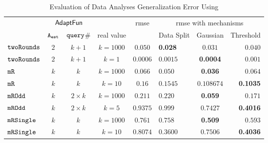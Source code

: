 {\footnotesize
\begin {table}[t]
        \vspace{-0.5cm}
        \caption{Evaluation of Data Analyses Generalization Error Using {\THESYSTEM}}
    \vspace{-0.4cm}
        \label{tb:adapt-generalization}
        \begin{center}
        \centering
{
        \begin{tabular}{|| >{\tiny}l || c | c |c || c || l | c | r ||  }
                \hhline{t|:======== :t:|}
        \multirow{2}{*}{Program $c$}
         & \multicolumn{2}{c}{$\textsf{AdaptFun}$}
         & &{rmse}
         & \multicolumn{3}{c||}{rmse with mechanisms} \\ 
         \hhline{||~---||~---||}
         & {${\mathtt{A_{est}}}$ } & {${\tt query}$\# } & real value &   & Data Split & Gaussian & Threshold  \\ 
         \hline \hline
        $  \mathtt{ twoRounds }$ & $ 2 $ & $  k + 1 $ & $ k = 1000$ & $0.050$   & {\textbf{0.028}} & {$0.031$} & $0.040$  \\
        \hhline{||-||---||-||---||}
        $  \mathtt{ twoRounds }$ & $ 2 $ & $  k + 1 $ & $ k =  1$ & $0.0006$   & {{$0.0015$}} & \textbf{0.0004} & {$0.001$}  \\
        \hhline{||-||---||-||---||}
         $  \mathtt{ mR}$ & $k$ & $k$ & $ k =  1000$  & $0.066$   & $0.050$ & {\textbf{0.036}} & $0.064$  \\
         \hhline{||-||---||-||---||}
         $  \mathtt{ mR}$ & $k$ & $k$ & $ k =  10$  & $0.16$   & $0.1545$  & $0.108674 $ & \textbf{0.1035}  \\
         \hhline{||-||---||-||---||}
         $  \mathtt{ mROdd }$ & $ k $   & $  2 \times k $& $ k =  1000$ & $0.211$   & $0.220$ & {\textbf{0.059}} & $0.171$  \\
         \hhline{||-||---||-||---||}
         $  \mathtt{ mROdd }$ & $ k $   & $  2 \times k $& $ k =  5$ & $0.9375$   & $0.999$ & $0.7427$ & {\textbf{0.4016}}  \\
         \hhline{||-||---||-||---||}
         $  \mathtt{ mRSingle }$ & $ k $ & $  k $ & $ k =  1000$  & $ 0.761$   & $ 0.758$ & {\textbf{0.509}} & $ 0.593$  \\
         \hhline{||-||---||-||---||}
         $  \mathtt{ mRSingle }$ & $ k $ & $  k $ & $ k =  10$  & $0.8074$   & $0.3600$ & $ 0.7506$ & {\textbf{0.4036}}  \\

\end{tabular}}
\end{center}
\end{table}}
